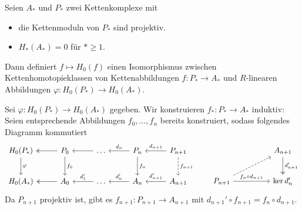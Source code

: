 \begin{proposition}[label=prop:113,{name=[{Isomorphismus zwischen Kettenhomotopieklassen und Abbildungen in 0-ter Homologie}]}]
	Seien $A_*$ und $P_*$ zwei Kettenkomplexe mit 
	\begin{itemize}[itemsep=0pt]
		\item die Kettenmoduln von $P_*$ sind projektiv.
		\item $H_*(A_*)=0$ für $*\ge 1$.
	\end{itemize}
	Dann definiert $f \mapsto H_0(f)$ einen Isomorphismus zwischen Kettenhomotopieklassen von Kettenabbildungen $f \colon P_* \to A_*$ und $R$-linearen Abbildungen $\varphi \colon H_0(P_*) \to H_0(A_*)$.
\end{proposition}
\begin{beweis}
	Sei $\varphi \colon H_0(P_*) \to H_0(A_*)$ gegeben. 
	Wir konstruieren $f_* \colon P_* \to A_*$ induktiv:
	Seien entsprechende Abbildungen $f_0,\ldots ,f_n$ bereits konstruiert, sodass folgendes Diagramm kommutiert
	\[
		\begin{tikzcd}[row sep=2.3em, column sep=2.7em]
			H_0(P_*) \dar["\varphi"] & P_0 \lar[two heads]  \dar["f_0"] & \ldots \lar & P_n \lar["d_n"']\dar["f_n"] & P_{n+1} \lar["d_{n+1}"'] \dar[dashed,"f_{n+1}"] \\
			H_0(A_*) & A_0 \lar[two heads] & \ldots \lar["d_1'"'] & A_n \lar["d_n'"'] & A_{n+1} \lar["d_{n+1}'"']
		\end{tikzcd}
		\hspace{2em}
		\begin{tikzcd}[row sep=2.3em, column sep=huge]
			\mbox{ } & A_{n+1} \dar[two heads,"d_{n+1}'"]\\
			P_{n+1} \ar[ur,dashed] \rar["f_n \circ d_{n+1}"] & \ker d_{n}'
		\end{tikzcd}
	\]
	Da $P_{n+1}$ projektiv ist, gibt es $f_{n+1} \colon P_{n+1} \to A_{n+1}$ mit $d_{n+1}' \circ f_{n+1} = f_n \circ d_{n+1}$.
	

\end{beweis}
